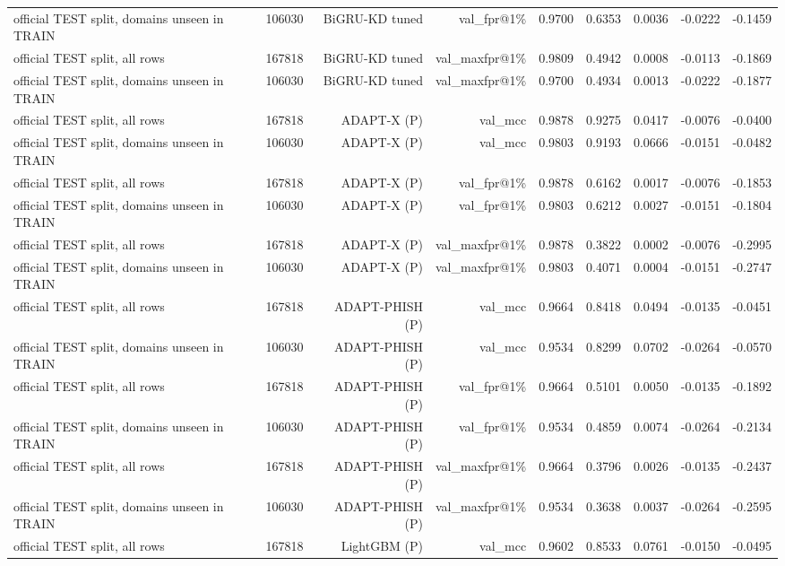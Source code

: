 \begin{table}[t]
\begin{tabular}{llrrrrrrr}
official TEST split, domains unseen in TRAIN & 106030 & BiGRU-KD tuned & val\_fpr@1\% & 0.9700 & 0.6353 & 0.0036 & -0.0222 & -0.1459 \\
official TEST split, all rows & 167818 & BiGRU-KD tuned & val\_maxfpr@1\% & 0.9809 & 0.4942 & 0.0008 & -0.0113 & -0.1869 \\
official TEST split, domains unseen in TRAIN & 106030 & BiGRU-KD tuned & val\_maxfpr@1\% & 0.9700 & 0.4934 & 0.0013 & -0.0222 & -0.1877 \\
official TEST split, all rows & 167818 & ADAPT-X (P) & val\_mcc & 0.9878 & 0.9275 & 0.0417 & -0.0076 & -0.0400 \\
official TEST split, domains unseen in TRAIN & 106030 & ADAPT-X (P) & val\_mcc & 0.9803 & 0.9193 & 0.0666 & -0.0151 & -0.0482 \\
official TEST split, all rows & 167818 & ADAPT-X (P) & val\_fpr@1\% & 0.9878 & 0.6162 & 0.0017 & -0.0076 & -0.1853 \\
official TEST split, domains unseen in TRAIN & 106030 & ADAPT-X (P) & val\_fpr@1\% & 0.9803 & 0.6212 & 0.0027 & -0.0151 & -0.1804 \\
official TEST split, all rows & 167818 & ADAPT-X (P) & val\_maxfpr@1\% & 0.9878 & 0.3822 & 0.0002 & -0.0076 & -0.2995 \\
official TEST split, domains unseen in TRAIN & 106030 & ADAPT-X (P) & val\_maxfpr@1\% & 0.9803 & 0.4071 & 0.0004 & -0.0151 & -0.2747 \\
official TEST split, all rows & 167818 & ADAPT-PHISH (P) & val\_mcc & 0.9664 & 0.8418 & 0.0494 & -0.0135 & -0.0451 \\
official TEST split, domains unseen in TRAIN & 106030 & ADAPT-PHISH (P) & val\_mcc & 0.9534 & 0.8299 & 0.0702 & -0.0264 & -0.0570 \\
official TEST split, all rows & 167818 & ADAPT-PHISH (P) & val\_fpr@1\% & 0.9664 & 0.5101 & 0.0050 & -0.0135 & -0.1892 \\
official TEST split, domains unseen in TRAIN & 106030 & ADAPT-PHISH (P) & val\_fpr@1\% & 0.9534 & 0.4859 & 0.0074 & -0.0264 & -0.2134 \\
official TEST split, all rows & 167818 & ADAPT-PHISH (P) & val\_maxfpr@1\% & 0.9664 & 0.3796 & 0.0026 & -0.0135 & -0.2437 \\
official TEST split, domains unseen in TRAIN & 106030 & ADAPT-PHISH (P) & val\_maxfpr@1\% & 0.9534 & 0.3638 & 0.0037 & -0.0264 & -0.2595 \\
official TEST split, all rows & 167818 & LightGBM (P) & val\_mcc & 0.9602 & 0.8533 & 0.0761 & -0.0150 & -0.0495 \\

\end{tabular}
\end{table}
